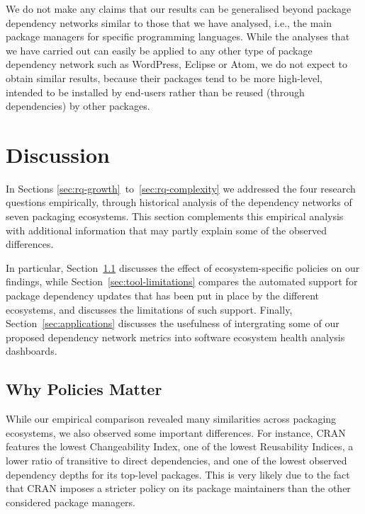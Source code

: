 \documentclass[smallextended]{svjour3}       %
\newcommand{\sect}[1]{Section~\ref{#1}}
\newcommand{\cran}{\textsf{CRAN}\xspace}
\begin{document}
We do not make any claims that our results can be generalised beyond package dependency networks similar to those that we have analysed, i.e., the main package managers for specific programming languages. While the analyses that we have carried out can easily be applied to any other type of package dependency network such as \textsf{WordPress}, \textsf{Eclipse} or \textsf{Atom}, we do not expect to obtain similar results, because their packages tend to be more high-level, intended to be installed by end-users rather than be reused (through dependencies) by other packages.


\section{Discussion}
\label{sec:discussion}

In Sections \ref{sec:rq-growth}~to~\ref{sec:rq-complexity} we addressed the four research questions empirically, through historical analysis of the dependency networks of seven packaging ecosystems.
This section complements this empirical analysis with additional information that may partly explain some of the observed differences.

In particular, \sect{sec:policy} discusses the effect of ecosystem-specific policies on our findings, while \sect{sec:tool-limitations}
compares the automated support for package dependency updates that has been put in place by the different ecosystems, and discusses the limitations of such support. 
Finally, \sect{sec:applications} discusses the usefulness of intergrating some of our proposed dependency network metrics into software ecosystem health analysis dashboards.

\subsection{Why Policies Matter}
\label{sec:policy}

While our empirical comparison revealed many similarities across packaging ecosystems, we also observed some important differences.
For instance, \cran features the lowest Changeability Index, one of the lowest Reusability Indices, a lower ratio of transitive to direct dependencies, and one of the lowest observed dependency depths for its top-level packages. 
This is very likely due to the fact that \cran imposes a stricter policy on its package maintainers than the other considered package managers. 
\end{document}
